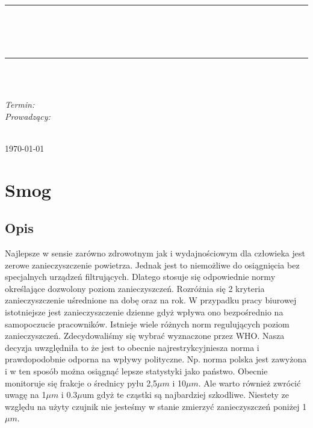 \documentclass[10pt, a4paper]{article}
\begin{document}
\def\tablename{Tabela}	%

\begin{titlepage}
	\begin{center}
		\textsc{\LARGE \formakursu}\\[1cm]		
		\textsc{\Large \kurs}\\[0.5cm]		
		\rule{\textwidth}{0.08cm}\\[0.4cm]
		{\huge \bfseries \doctype}\\[1cm]
		{\huge \bfseries \projectname}\\[0.5cm]
		\rule{\textwidth}{0.08cm}\\[1cm]
		
		\begin{flushright} \large

		\osobaC\\

		
		\emph{Termin: }\termin\\[0.4cm]

		\emph{Prowadzący:} \\
		\prowadzacy \\
		
		\end{flushright}
		
		\vfill
		
		{\large \today}
	\end{center}	
\end{titlepage}


\section{Smog}
	\subsection{Opis}
	Najlepsze w sensie zarówno zdrowotnym jak i wydajnościowym dla człowieka jest zerowe zanieczyszczenie powietrza. Jednak jest to niemożliwe do osiągnięcia bez specjalnych urządzeń filtrujących. Dlatego stosuje się odpowiednie normy określające dozwolony poziom zanieczyszczeń. Rozróżnia się 2 kryteria zanieczyszczenie uśrednione na dobę oraz na rok. W przypadku pracy biurowej istotniejsze jest zanieczyszczenie dzienne gdyż wpływa ono bezpośrednio na samopoczucie pracowników. Istnieje wiele różnych norm regulujących poziom zanieczyszczeń. Zdecydowaliśmy się wybrać wyznaczone przez WHO\cite{WHO}. Nasza decyzja uwzględniła to że jest to obecnie najrestrykcyjniesza norma i prawdopodobnie odporna na wpływy polityczne. Np. norma polska jest zawyżona i w ten sposób można osiągnąć lepsze statystyki jako państwo. Obecnie monitoruje się frakcje o średnicy pyłu 2,5$\mu m$ i 10$\mu m$. Ale warto również zwrócić uwagę na 1$\mu m$ i 0.3$\mu$um gdyż te cząstki są najbardziej szkodliwe. Niestety ze względu na użyty czujnik nie jesteśmy w stanie zmierzyć zanieczyszczeń poniżej 1$\mu m$.
	
\end{document}
